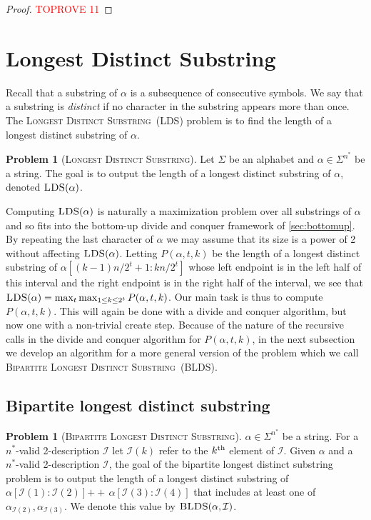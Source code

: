 \documentclass[12pt]{article}
\newcommand{\concat}{\ensuremath{+\!\!\!\!+\,}}
\newcommand{\Iset}{\mathcal{I}}
\newcommand{\bldsf}{\textsc{Bipartite Longest Distinct Substring}}
\newcommand{\blds}{\textsc{BLDS}}
\newcommand{\kth}{k^{\scriptsize \mbox{{\rm th}}}}
\newcommand{\upto}{\mathbin{:}}
\newcommand{\ldsf}{\textsc{Longest Distinct Substring}}
\newcommand{\lds}{\textsc{LDS}}
\theoremstyle{definition}
\newtheorem{problem}[theorem]{Problem}
\begin{document}
\begin{proof}\textcolor{red}{TOPROVE 11}\end{proof}


\section{Longest Distinct Substring}
\label{sec:lds}
Recall that a substring of $\alpha$ is a subsequence of consecutive symbols. 
We say that a substring is \emph{distinct} if no character in the substring appears more than once.  The \ldsf \ (\lds) problem is to find the length of a longest distinct substring of $\alpha$.

\begin{problem}[\ldsf]
Let $\Sigma$ be an alphabet and $\alpha \in \Sigma^{n^*}$ be a string. The goal is to output the length of a longest distinct substring of $\alpha$, denoted $\lds(\alpha)$.
\end{problem}

Computing $\lds(\alpha)$ is naturally a maximization problem over all substrings of $\alpha$ and so fits into the bottom-up divide and conquer framework of \cref{sec:bottomup}.  By repeating the last character of $\alpha$ we may assume that its size is a power of 2 without affecting $\lds(\alpha)$.  
Letting $P(\alpha, t, k)$ be the length of a longest distinct substring of $\alpha[(k-1)n/2^t+1 \upto k n/2^t]$ whose left endpoint is in the left half of this interval and the right endpoint is in the right half of the interval, we see that $\lds(\alpha) = \max_t \max_{1 \le k \le 2^t} P(\alpha, t, k)$.
Our main task is thus to compute $P(\alpha, t, k)$. This will again be done with a divide and conquer algorithm, but now one with a non-trivial create step.  
Because of the nature of the recursive calls in the divide and conquer algorithm for $P(\alpha,t,k)$, in the next subsection we develop an algorithm for a more general version of the problem which we call \bldsf\ (\blds).

\subsection{Bipartite longest distinct substring}
\begin{problem}[\bldsf] 
$\alpha \in \Sigma^{n^*}$ be a string. For a $n^*$-valid 2-description $\Iset$ let $\Iset(k)$ refer to the $\kth$ element of $\Iset$.  
Given $\alpha$ and a $n^*$-valid 2-description $\Iset$, the goal of the bipartite longest distinct substring problem is to output the length of a longest distinct substring of $\alpha[\Iset(1) \colon \Iset(2)] \concat \alpha[\Iset(3) \colon \Iset(4)]$ that includes at least one of $\alpha_{\Iset(2)}, \alpha_{\Iset(3)}$. 
We denote this value by $\blds(\alpha, \Iset)$. 
\end{problem}
\end{document}

